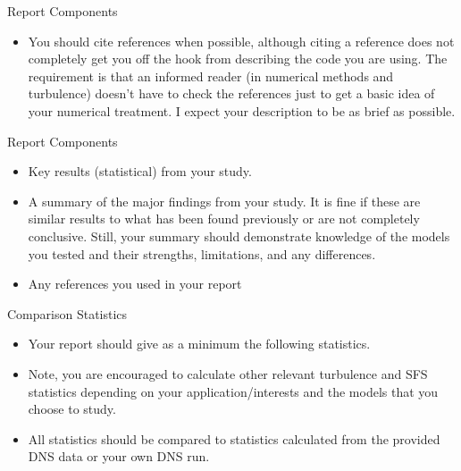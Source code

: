 \begin{frame}{Report Components}
\begin{itemize}
	\item You should cite references when possible, although citing a reference does not completely get you off the hook from describing the code you are using.  The requirement is that an informed reader (in numerical methods and turbulence) doesn't have to check the references just to get a basic idea of your numerical treatment. I expect your description to be as brief as possible.
\end{itemize}
\end{frame}

\begin{frame}{Report Components}
\begin{itemize}
	\item Key results (statistical) from your study. 
\item A summary of the major findings from your study.  It is fine if these are similar results to what has been found previously or are not completely conclusive.  Still, your summary should demonstrate knowledge of the models you tested and their strengths, limitations, and any differences.
\item Any references you used in your report
\end{itemize}
\end{frame}

\begin{frame}{Comparison Statistics}
\begin{itemize}
	\item Your report should give as a minimum the following statistics.  
	\item Note, you are encouraged to calculate other relevant turbulence and SFS statistics depending on your application/interests and the models that you choose to study. 
	\item All statistics should be compared to statistics calculated from the provided DNS data or your own DNS run.
\end{itemize}
\end{frame}

